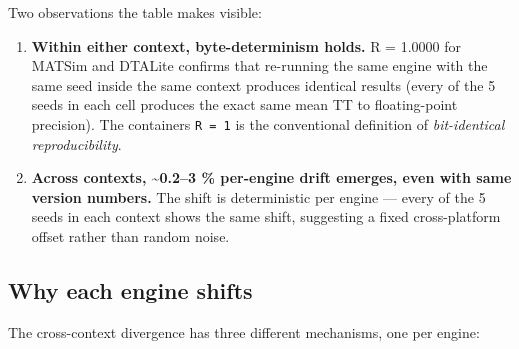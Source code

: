 Two observations the table makes visible:

\begin{enumerate}
\def\labelenumi{\arabic{enumi}.}
\item
  \textbf{Within either context, byte-determinism holds.} R = 1.0000 for
  MATSim and DTALite confirms that re-running the same engine with the
  same seed inside the same context produces identical results (every of
  the 5 seeds in each cell produces the exact same mean TT to
  floating-point precision). The container\textquotesingle s
  \texttt{R\ =\ 1} is the conventional definition of \emph{bit-identical
  reproducibility}.
\item
  \textbf{Across contexts, \textasciitilde0.2--3 \% per-engine drift
  emerges, even with same version numbers.} The shift is deterministic
  per engine --- every of the 5 seeds in each context shows the same
  shift, suggesting a fixed cross-platform offset rather than random
  noise.
\end{enumerate}

\subsection{Why each engine shifts}\label{why-each-engine-shifts}

The cross-context divergence has three different mechanisms, one per
engine:

